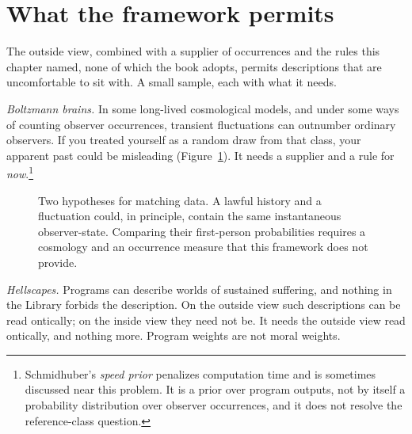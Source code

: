 \section*{What the framework permits}

The outside view, combined with a supplier of occurrences and the rules this chapter named, none of which the book adopts, permits descriptions that are uncomfortable to sit with. A small sample, each with what it needs.

\emph{Boltzmann brains.} In some long-lived cosmological models, and under some ways of counting observer occurrences, transient fluctuations can outnumber ordinary observers. If you treated yourself as a random draw from that class, your apparent past could be misleading (Figure~\ref{fig:boltzmann-brain}). It needs a supplier and a rule for \emph{now}.\footnote{Schmidhuber's \emph{speed prior} penalizes computation time and is sometimes discussed near this problem. It is a prior over program outputs, not by itself a probability distribution over observer occurrences, and it does not resolve the reference-class question.}

\begin{figure}[h]
\centering
{}
\caption{Two hypotheses for matching data. A lawful history and a fluctuation could, in principle, contain the same instantaneous observer-state. Comparing their first-person probabilities requires a cosmology and an occurrence measure that this framework does not provide.}
\label{fig:boltzmann-brain}
\end{figure}

\emph{Hellscapes.} Programs can describe worlds of sustained suffering, and nothing in the Library forbids the description. On the outside view such descriptions can be read ontically; on the inside view they need not be. It needs the outside view read ontically, and nothing more. Program weights are not moral weights.


